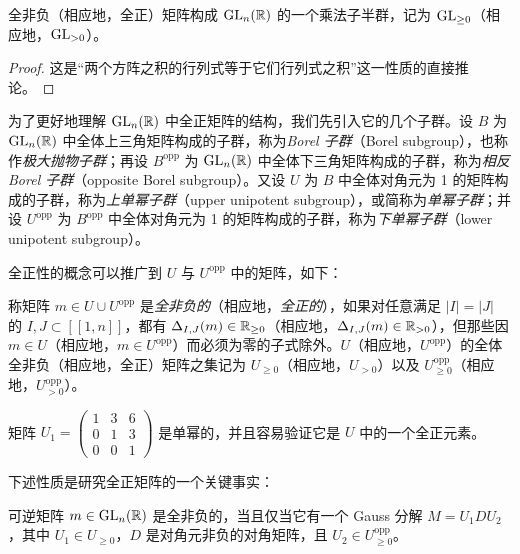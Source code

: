 \begin{proposition}[12.3]
全非负（相应地，全正）矩阵构成 $\operatorname{GL}_n(\mathbb{R})$ 的一个乘法子半群，记为 $\operatorname{GL}_{\ge 0}$（相应地，$\operatorname{GL}_{>0}$）。
\end{proposition}

\begin{proof}
这是“两个方阵之积的行列式等于它们行列式之积”这一性质的直接推论。
\end{proof}


为了更好地理解 $\operatorname{GL}_n(\mathbb{R})$ 中全正矩阵的结构，我们先引入它的几个子群。设 $B$ 为 $\operatorname{GL}_n(\mathbb{R})$ 中全体上三角矩阵构成的子群，称为\emph{Borel 子群}（Borel subgroup），也称作\emph{极大抛物子群}；再设 $B^{\mathrm{opp}}$ 为 $\operatorname{GL}_n(\mathbb{R})$ 中全体下三角矩阵构成的子群，称为\emph{相反 Borel 子群}（opposite Borel subgroup）。又设 $U$ 为 $B$ 中全体对角元为 1 的矩阵构成的子群，称为\emph{上单幂子群}（upper unipotent subgroup），或简称为\emph{单幂子群}；并设 $U^{\mathrm{opp}}$ 为 $B^{\mathrm{opp}}$ 中全体对角元为 1 的矩阵构成的子群，称为\emph{下单幂子群}（lower unipotent subgroup）。

全正性的概念可以推广到 $U$ 与 $U^{\mathrm{opp}}$ 中的矩阵，如下：

\begin{definition}[12.4]
称矩阵 $m\in U\cup U^{\mathrm{opp}}$ 是\emph{全非负的}（相应地，\emph{全正的}），如果对任意满足 $|I|=|J|$ 的 $I,J\subset[\![1,n]\!]$，都有 $\Delta_{I,J}(m)\in\mathbb{R}_{\ge 0}$（相应地，$\Delta_{I,J}(m)\in\mathbb{R}_{>0}$），但那些因 $m\in U$（相应地，$m\in U^{\mathrm{opp}}$）而必须为零的子式除外。$U$（相应地，$U^{\mathrm{opp}}$）的全体全非负（相应地，全正）矩阵之集记为 $U_{\ge 0}$（相应地，$U_{>0}$）以及 $U^{\mathrm{opp}}_{\ge 0}$（相应地，$U^{\mathrm{opp}}_{>0}$）。
\end{definition}

\begin{example}[12.5]
矩阵 $U_1=\begin{pmatrix} 1 & 3 & 6\\ 0 & 1 & 3\\ 0 & 0 & 1\end{pmatrix}$ 是单幂的，并且容易验证它是 $U$ 中的一个全正元素。
\end{example}

下述性质是研究全正矩阵的一个关键事实：

\begin{proposition}
可逆矩阵 $m\in\operatorname{GL}_n(\mathbb{R})$ 是全非负的，当且仅当它有一个 Gauss 分解 $M=U_1DU_2$，其中 $U_1\in U_{\ge 0}$，$D$ 是对角元非负的对角矩阵，且 $U_2\in U^{\mathrm{opp}}_{\ge 0}$。
\end{proposition}

